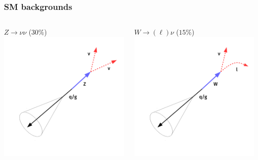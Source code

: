 \documentclass[aspectratio=169,xcolor=dvipsnames,,table,compress]{beamer}
\begin{document}
\begin{frame}[t]  \frametitle{SM backgrounds}
  \centering
  \vspace{5mm}
  \begin{columns}
  \begin{column}{0.33\textwidth}
    \centering
    $Z\rightarrow\nu\nu $ ($30\%$) \\
    \includegraphics[width=\textwidth]{../figures/talk/zsr.pdf} \pause
  \end{column}
  \begin{column}{0.33\textwidth}
    \centering
    $W\rightarrow (\ell)\nu$ ($15\%$) \\
    \includegraphics[width=\textwidth]{../figures/talk/wsr.pdf} \pause

\end{column}
\end{columns}
\end{frame}
\end{document}
